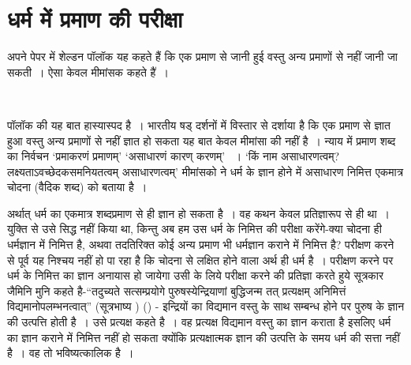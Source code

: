 \section*{धर्म में प्रमाण की परीक्षा}

अपने पेपर  में शेल्डन पॉलॉक यह कहते हैं कि एक प्रमाण से जानी हुई वस्तु अन्य प्रमाणों से नहीं जानी जा सकती~। ऐसा केवल मीमांसक कहते है॑~।

\begin{myquote}

~\hfill {}
\end{myquote}

पॉलॉक की यह बात हास्यास्पद है~। भारतीय षड् दर्शनों में विस्तार से दर्शाया है कि एक प्रमाण से ज्ञात हुआ वस्तु अन्य प्रमाणों से नहीं ज्ञात हो सकता यह बात केवल मीमांसा की नहीं है~। न्याय में प्रमाण शब्द का निर्वचन ‘प्रमाकरणं प्रमाणम्' ‘असाधारणं कारण् करणम्' ~। ‘किं नाम असाधारणत्वम्? लक्ष्यताऽवच्छेदकसमनियतत्वम् असाधारणत्वम्' मीमांसको ने धर्म के ज्ञान होने में असाधारण निमित्त एकमात्र चोदना (वैदिक शब्द) को बताया है~।

अर्थात् धर्म का एकमात्र शब्दप्रमाण से ही ज्ञान हो सकता है~। वह कथन केवल प्रतिज्ञारूप से ही था~। युक्ति से उसे सिद्ध नहीं किया था, किन्तु अब हम उस धर्म के निमित्त की परीक्षा करेंगे-क्या चोदना ही धर्मज्ञान में निमित्त है, अथवा तदतिरिक्त कोई अन्य प्रमाण भी धर्मज्ञान कराने में निमित्त है? परीक्षण करने से पूर्व यह निश्चय नहीं हो पा रहा है कि चोदना से लक्षित होने वाला अर्थ ही धर्म है~। परीक्षण करने पर धर्म के निमित्त का ज्ञान अनायास हो जायेगा उसी के लिये परीक्षा करने की प्रतिज्ञा करते हुये सूत्रकार जैमिनि मुनि कहते है-“तदुच्यते सत्सम्प्रयोगे पुरुषस्येन्द्रियाणां बुद्धिजन्म तत् प्रत्यक्षम् अनिमित्तं विद्यमानोपलम्भनत्वात्” (सूत्रभाष्य ) () - इन्द्रियों का विद्यमान वस्तु के साथ सम्बन्ध होने पर पुरुष के ज्ञान की उत्पत्ति होती है~। उसे प्रत्यक्ष कहते है~। वह प्रत्यक्ष विद्यमान वस्तु का ज्ञान कराता है इसलिए धर्म का ज्ञान कराने में निमित्त नहीं हो सकता क्योंकि प्रत्यक्षात्मक ज्ञान की उत्पत्ति के समय धर्म की सत्ता नहीं है~। वह तो भविष्यत्कालिक है~।

